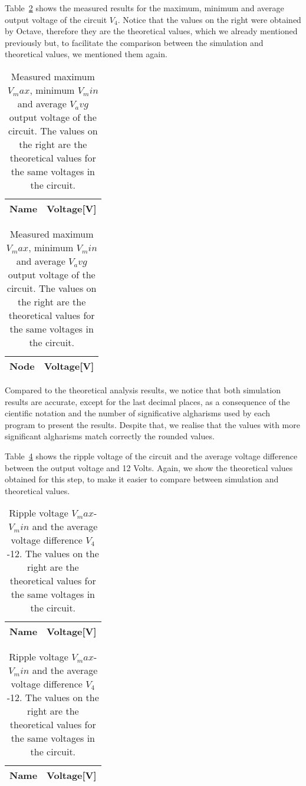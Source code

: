 	Table~\ref{tab1:op} shows the measured results for the maximum, minimum and average output voltage of the circuit $V_4$. 
	Notice that the values on the right were obtained by Octave, therefore they are the theoretical values, which we already 
	mentioned previously but, to facilitate the comparison between the simulation and theoretical values, we mentioned them again.

\begin{table}[H]
  \centering
  \begin{tabular}{|l|r|}
    \hline    
    {\bf Name} & {\bf Voltage[V]} \\ \hline
    
  \end{tabular}
  \begin{tabular}{|l|r|}
    \hline    
    {\bf Node} & {\bf Voltage[V]} \\ \hline
    
  \end{tabular}
  \caption {Measured maximum $V_max$, minimum $V_min$ and average $V_avg$ output voltage of the circuit. 
  The values on the right are the theoretical values for the same voltages in the circuit.}
  \label{tab1:op}
\end{table}


	Compared to the theoretical analysis results, we notice that both simulation results are accurate, except for the last 
decimal places, as a consequence of the cientific notation and the number of significative algharisms used by each program to 
present the results. Despite that, we realise that the values with more significant algharisms match correctly the rounded values.


	Table~\ref{tab2:op} shows the ripple voltage of the circuit and the average voltage difference
	between the output voltage and 12 Volts. Again, we show the theoretical values obtained for this step, 
	to make it easier to compare between simulation and theoretical values.


\begin{table}[H]
  \centering
  \begin{tabular}{|l|r|}
    \hline    
    {\bf Name} & {\bf Voltage[V]} \\ \hline
    
  \end{tabular}
  \begin{tabular}{|l|r|}
    \hline    
    {\bf Name} & {\bf Voltage[V]} \\ \hline
    
  \end{tabular}
  \caption{Ripple voltage $V_max$-$V_min$ and the average voltage difference $V_4$-12. The values on the right are the theoretical 
  values for the same voltages in the circuit.}
  \label{tab2:op}
\end{table}


